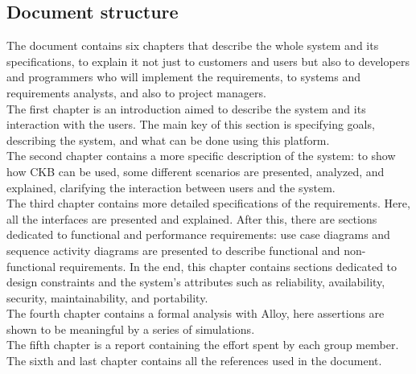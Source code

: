 \subsection{Document structure}
The document contains six chapters that describe the whole system and its specifications, to explain it not just to customers and users but also to developers and programmers who will implement the requirements, to systems and requirements analysts, and also to project managers. \\
The first chapter is an introduction aimed to describe the system and its interaction with the users. The main key of this section is specifying goals, describing the system, and what can be done using this platform. \\
The second chapter contains a more specific description of the system: to show how CKB can be used, some different scenarios are presented, analyzed, and explained, clarifying the interaction between users and the system. \\
The third chapter contains more detailed specifications of the requirements. Here, all the interfaces are presented and explained. After this, there are sections dedicated to functional and performance requirements: use case diagrams and sequence activity diagrams
are presented to describe functional and non-functional requirements. In the end, this chapter contains sections dedicated to design constraints and the system’s attributes such as reliability, availability, security, maintainability, and portability. \\
The fourth chapter contains a formal analysis with Alloy, here assertions are shown to be meaningful by a series of simulations. \\
The fifth chapter is a report containing the effort spent by each group member. \\
The sixth and last chapter contains all the references used in the document.